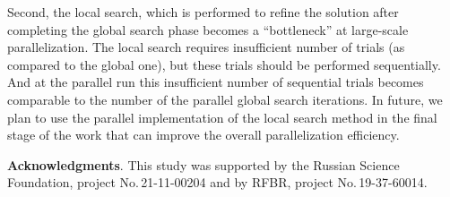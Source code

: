 \documentclass{svproc}
\begin{document}
Second, the local search, which is performed to refine the solution after completing the global search phase becomes a ``bottleneck'' at large-scale parallelization. The local search requires insufficient number of trials (as compared to the global one), but these trials should be performed sequentially. And at the parallel run this insufficient number of sequential trials becomes comparable to the number of the parallel global search iterations. 
In future, we plan to use the parallel implementation of the local search method in the final stage of the work that can improve the overall parallelization efficiency.



\medskip

\textbf{Acknowledgments}. This study was supported by the Russian Science Foundation, project No.\,21-11-00204 and by RFBR, project No.\,19-37-60014.

%
%

{}
\end{document}
